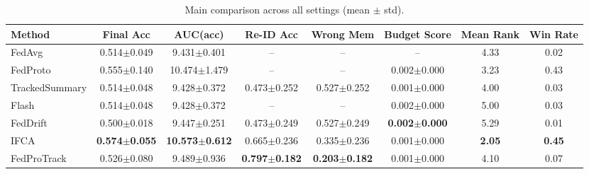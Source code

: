 \begin{table}[t]
\centering
\caption{Main comparison across all settings (mean $\pm$ std).}
\label{tab:main}
\begin{tabular}{lccccccc}
\toprule
Method & Final Acc & AUC(acc) & Re-ID Acc & Wrong Mem & Budget Score & Mean Rank & Win Rate \\
\midrule
FedAvg & 0.514$\pm$0.049 & 9.431$\pm$0.401 & -- & -- & -- & 4.33 & 0.02 \\
FedProto & 0.555$\pm$0.140 & 10.474$\pm$1.479 & -- & -- & 0.002$\pm$0.000 & 3.23 & 0.43 \\
TrackedSummary & 0.514$\pm$0.048 & 9.428$\pm$0.372 & 0.473$\pm$0.252 & 0.527$\pm$0.252 & 0.001$\pm$0.000 & 4.00 & 0.03 \\
Flash & 0.514$\pm$0.048 & 9.428$\pm$0.372 & -- & -- & 0.002$\pm$0.000 & 5.00 & 0.03 \\
FedDrift & 0.500$\pm$0.018 & 9.447$\pm$0.251 & 0.473$\pm$0.249 & 0.527$\pm$0.249 & \textbf{0.002$\pm$0.000} & 5.29 & 0.01 \\
IFCA & \textbf{0.574$\pm$0.055} & \textbf{10.573$\pm$0.612} & 0.665$\pm$0.236 & 0.335$\pm$0.236 & 0.001$\pm$0.000 & \textbf{2.05} & \textbf{0.45} \\
FedProTrack & 0.526$\pm$0.080 & 9.489$\pm$0.936 & \textbf{0.797$\pm$0.182} & \textbf{0.203$\pm$0.182} & 0.001$\pm$0.000 & 4.10 & 0.07 \\
\bottomrule
\end{tabular}
\end{table}
